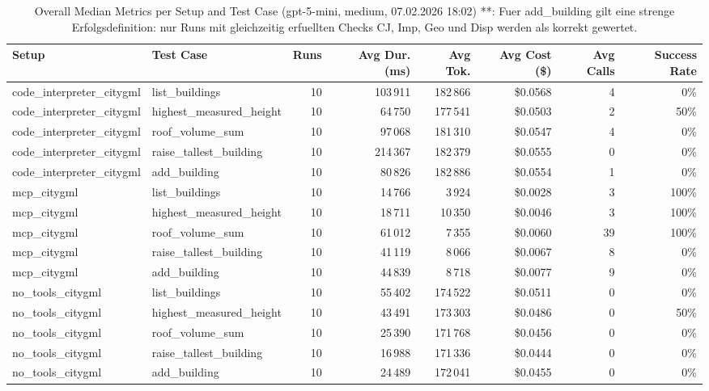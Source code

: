\documentclass[a4paper,11pt]{article}
\begin{document}
\begin{table}[H]
\centering
\scriptsize
\caption{Overall Median Metrics per Setup and Test Case (gpt-5-mini, medium, 07.02.2026 18:02) **: Fuer add\_building gilt eine strenge Erfolgsdefinition: nur Runs mit gleichzeitig erfuellten Checks CJ, Imp, Geo und Disp werden als korrekt gewertet.}
\begin{tabular}{l l r r r r r r}
\toprule
Setup & Test Case & Runs & Avg Dur. (ms) & Avg Tok. & Avg Cost (\$) & Avg Calls & Success Rate \\
\midrule
code\_interpreter\_citygml & list\_buildings & 10 & 103\,911 & 182\,866 & \$0.0568 & 4 & 0\% \\
code\_interpreter\_citygml & highest\_measured\_height & 10 & 64\,750 & 177\,541 & \$0.0503 & 2 & 50\% \\
code\_interpreter\_citygml & roof\_volume\_sum & 10 & 97\,068 & 181\,310 & \$0.0547 & 4 & 0\% \\
code\_interpreter\_citygml & raise\_tallest\_building & 10 & 214\,367 & 182\,379 & \$0.0555 & 0 & 0\% \\
code\_interpreter\_citygml & add\_building & 10 & 80\,826 & 182\,886 & \$0.0554 & 1 & 0\% \\
\midrule
mcp\_citygml & list\_buildings & 10 & 14\,766 & 3\,924 & \$0.0028 & 3 & 100\% \\
mcp\_citygml & highest\_measured\_height & 10 & 18\,711 & 10\,350 & \$0.0046 & 3 & 100\% \\
mcp\_citygml & roof\_volume\_sum & 10 & 61\,012 & 7\,355 & \$0.0060 & 39 & 100\% \\
mcp\_citygml & raise\_tallest\_building & 10 & 41\,119 & 8\,066 & \$0.0067 & 8 & 0\% \\
mcp\_citygml & add\_building & 10 & 44\,839 & 8\,718 & \$0.0077 & 9 & 0\% \\
\midrule
no\_tools\_citygml & list\_buildings & 10 & 55\,402 & 174\,522 & \$0.0511 & 0 & 0\% \\
no\_tools\_citygml & highest\_measured\_height & 10 & 43\,491 & 173\,303 & \$0.0486 & 0 & 50\% \\
no\_tools\_citygml & roof\_volume\_sum & 10 & 25\,390 & 171\,768 & \$0.0456 & 0 & 0\% \\
no\_tools\_citygml & raise\_tallest\_building & 10 & 16\,988 & 171\,336 & \$0.0444 & 0 & 0\% \\
no\_tools\_citygml & add\_building & 10 & 24\,489 & 172\,041 & \$0.0455 & 0 & 0\% \\
\bottomrule
\end{tabular}
\end{table}
\end{document}
